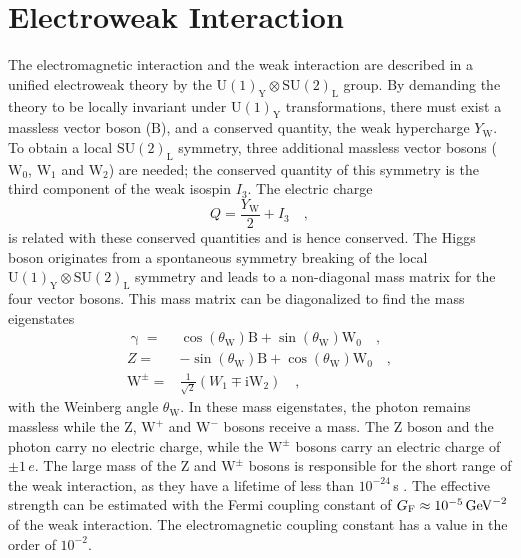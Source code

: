 \section{Electroweak Interaction}

The electromagnetic interaction and the weak interaction are described in a unified electroweak theory by the $\textrm{U}(1)_\textrm{Y} \otimes \textrm{SU}(2)_\textrm{L}$ group. By demanding the theory to be locally invariant under $\textrm{U}(1)_\textrm{Y}$ transformations, there must exist a massless vector boson ($\textrm{B}$), and a conserved quantity, the weak hypercharge $Y_\textrm{W}$. To obtain a local $\textrm{SU}(2)_\textrm{L}$ symmetry, three additional massless vector bosons ($\textrm{W}_0$, $\textrm{W}_1$ and $\textrm{W}_2$) are needed; the conserved quantity of this symmetry is the third component of the weak isospin $I_3$. The electric charge
\begin{equation}
Q = \frac{Y_\textrm{W}}{2} + I_3 \quad ,
\end{equation}
is related with these conserved quantities and is hence conserved. The Higgs boson originates from a spontaneous symmetry breaking of the local $\textrm{U}(1)_\textrm{Y} \otimes \textrm{SU}(2)_\textrm{L}$ symmetry and leads to a non-diagonal mass matrix for the four vector bosons. This mass matrix can be diagonalized to find the mass eigenstates 
\begin{equation}
\begin{split}
\upgamma =& \cos(\theta_\textrm{W}) \textrm{B} + \sin(\theta_\textrm{W}) \textrm{W}_0 \quad ,	\\
Z =& - \sin(\theta_\textrm{W}) \textrm{B} + \cos(\theta_\textrm{W}) \textrm{W}_0 \quad ,		\\
\textrm{W}^{\pm} =& \frac{1}{\sqrt{2}}(W_1 \mp \textrm{i} \textrm{W}_2) \quad ,
\end{split}
\end{equation}
with the Weinberg angle $\theta_\textrm{W}$. In these mass eigenstates, the photon remains massless while the Z, $\textrm{W}^+$ and $\textrm{W}^-$ bosons receive a mass. The Z boson and the photon carry no electric charge, while the $\textrm{W}^\pm$ bosons carry an electric charge of $\pm 1\,\si{\elementarycharge}$. The large mass of the Z and $\textrm{W}^\pm$ bosons is responsible for the short range of the weak interaction, as they have a lifetime of less than $10^{-24}$\,s \cite{pdg}. The effective strength can be estimated with the Fermi coupling constant of $G_\textrm{F} \approx 10^{-5}\,\mathrm{GeV}^{-2}$ of the weak interaction. The electromagnetic coupling constant has a value in the order of $10^{-2}$.\\

